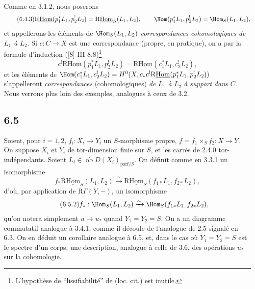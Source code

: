 Comme en 3.1.2, nous poserons
\begin{equation}
\tag{6.4.3}
\mathrm{R}\underline{\mathrm{Hom}}(p_1^*L_1,p_2^!L_2)=\mathrm{R}\underline{\mathrm{Hom}}_S(L_1,L_2),\qquad
\Hom(p_1^*L_1,p_2^!L_2)=\Hom_S(L_1,L_2),
\end{equation}
et appellerons les éléments de $\Hom_S(L_1,L_2)$ \emph{correspondances cohomologiques de $L_1$ à $L_2$}. Si $c:C\to X$ est une correspondance (propre, en pratique), on a par la formule d'induction ([8] III 8.8)\footnote{L'hypothèse de ``lissifiabilité'' de (loc. cit.) est inutile.}
\begin{equation}
\tag{6.4.4}
c^!\mathrm{R}\underline{\mathrm{Hom}}(p_1^*L_1,p_2^!L_2)=\mathrm{R}\underline{\mathrm{Hom}}(c_1^*L_1,c_2^!L_2),
\end{equation}
et les
éléments de $\Hom(c_1^*L_1,c_2^!L_2)=H^0(X,c_*c^!\mathrm{R}\underline{\mathrm{Hom}}(p_1^*L_1,p_2^!L_2))$ s'appelleront \emph{correspondances} (cohomologiques) \emph{de $L_1$ à $L_2$ à support dans $C$}. Nous verrons plus loin des exemples, analogues à ceux de 3.2.

\subsection*{6.5}
Soient, pour $i=1,2$, $f_i:X_i\to Y_i$ un $S$-morphisme propre, $f=f_1\times_Sf_2:X\to Y$. On suppose $X_i$ et $Y_i$ de tor-dimension finie sur $S$, et les carrés de 2.4.0 tor-indépendants. Soient $L_i\in\operatorname{ob}D(X_i)_{\mathrm{parf}/S}$. On définit comme en 3.3.1 un isomorphisme
\begin{equation}
\tag{6.5.1}
f_*\mathrm{R}\underline{\mathrm{Hom}}_S(L_1,L_2)\xrightarrow{\sim}\mathrm{R}\underline{\mathrm{Hom}}_S(f_{1*}L_1,f_{2*}L_2),
\end{equation}
d'où, par application de $\mathrm{R}\Gamma(Y,-)$, un isomorphisme
\begin{equation}
\tag{6.5.2}
f_*:\Hom_S(L_1,L_2)\xrightarrow{\sim}\Hom_S(f_{1*}L_1,f_{2*}L_2),
\end{equation}
qu'on notera simplement $u\mapsto u_*$ quand $Y_1=Y_2=S$. On a un diagramme commutatif analogue à 3.4.1, comme il découle de l'analogue de 2.5 signalé en 6.3. On en déduit un corollaire analogue à 6.5, et, dans le cas où $Y_1=Y_2=S$ est le spectre d'un corps, une description, analogue à celle de 3.6, des opérations $u_*$ sur la cohomologie.

